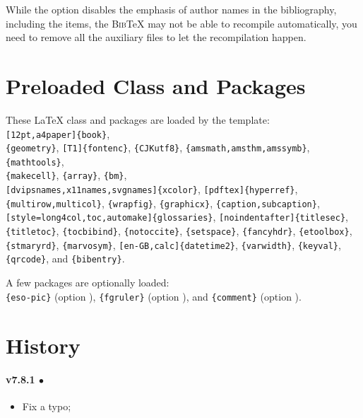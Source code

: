 While the  option disables the emphasis of author names in the bibliography, including the  items,
the {\textsc{Bib}\negthinspace\TeX} may not be able to recompile automatically,
you need to remove all the auxiliary files to let the recompilation happen.

\section{Preloaded Class and Packages}

These {\LaTeX} class and packages are loaded by the template:\\
\verb|[12pt,a4paper]{book}|,\\
\verb|{geometry}|,
\verb|[T1]{fontenc}|,
\verb|{CJKutf8}|,
\verb|{amsmath,amsthm,amssymb}|,
\verb|{mathtools}|,\\
\verb|{makecell}|,
\verb|{array}|,
\verb|{bm}|,\\
\verb|[dvipsnames,x11names,svgnames]{xcolor}|,
\verb|[pdftex]{hyperref}|,\\
\verb|{multirow,multicol}|,
\verb|{wrapfig}|,
\verb|{graphicx}|,
\verb|{caption,subcaption}|,\\
\verb|[style=long4col,toc,automake]{glossaries}|,
\verb|[noindentafter]{titlesec}|,
\verb|{titletoc}|,
\verb|{tocbibind}|,
\verb|{notoccite}|,
\verb|{setspace}|,
\verb|{fancyhdr}|,
\verb|{etoolbox}|,
\verb|{stmaryrd}|,
\verb|{marvosym}|,
\verb|[en-GB,calc]{datetime2}|,
\verb|{varwidth}|,
\verb|{keyval}|,
\verb|{qrcode}|, and
\verb|{bibentry}|.

A few packages are optionally loaded:\\
\verb|{eso-pic}| (option ),
\verb|{fgruler}| (option ), and
\verb|{comment}| (option ).

\section{History}

\newcommand{\VDT}[2]{v#1 $\bullet$ \DTMdate{#2}}

\paragraph{\VDT{7.8.1}{2026-05-06}}
	\begin{itemize}[noitemsep]
        \item Fix a typo;
	\end{itemize}


